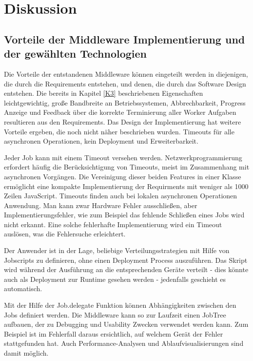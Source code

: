 
\chapter{Diskussion}
\label{K6}

\section{Vorteile der Middleware Implementierung und der gewählten Technologien}
Die Vorteile der entstandenen Middleware können eingeteilt werden in diejenigen, die durch die Requirements entstehen, und denen, die durch das Software Design entstehen. Die bereits in Kapitel \ref{K3} beschriebenen Eigenschaften leichtgewichtig, große Bandbreite an Betriebssystemen, Abbrechbarkeit, Progress Anzeige und Feedback über die korrekte Terminierung aller Worker Aufgaben resultieren aus den Requirements.
Das Design der Implementierung hat weitere Vorteile ergeben, die noch nicht näher beschrieben wurden. Timeouts für alle asynchronen Operationen, kein Deployment und Erweiterbarkeit.

Jeder Job kann mit einem Timeout versehen werden. Netzwerkprogrammierung erfordert häufig die Berücksichtigung von Timeouts, meist im Zusammenhang mit asynchronen Vorgängen. Die Vereinigung dieser beiden Features in einer Klasse ermöglicht eine kompakte Implementierung der Requirments mit weniger als 1000 Zeilen JavaScript. Timeouts finden auch bei lokalen asynchronen Operationen Anwendung. Man kann zwar Hardware Fehler ausschließen, aber Implementierungsfehler, wie zum Beispiel das fehlende Schließen eines Jobs wird nicht erkannt. Eine solche fehlerhafte Implementierung wird ein Timeout auslösen, was die Fehlersuche erleichtert.

Der Anwender ist in der Lage, beliebige Verteilungsstrategien mit Hilfe von Jobscripts zu definieren, ohne einen Deployment Process auszuführen. Das Skript wird während der Ausführung an die entsprechenden Geräte verteilt - dies könnte auch als Deployment zur Runtime gesehen werden - jedenfalls geschieht es automatisch.

Mit der Hilfe der Job.delegate Funktion können Abhängigkeiten zwischen den Jobs definiert werden. Die Middleware kann so zur Laufzeit einen JobTree aufbauen, der zu Debugging und Usability Zwecken verwendet werden kann. Zum Beispiel ist im Fehlerfall daraus ersichtlich, auf welchem Gerät der Fehler stattgefunden hat. Auch Performance-Analysen und Ablaufvisualisierungen sind damit möglich.

